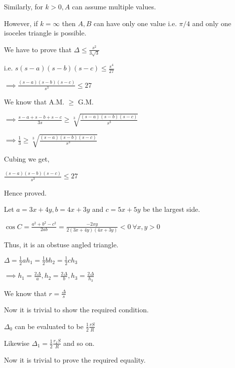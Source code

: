   Similarly, for $k > 0, A$ can assume multiple values.

  However, if $k = \infty$ then $A, B$ can have only one value i.e. $\pi/4$ and only one isoceles triangle is possible.

\item We have to prove that $\Delta \leq \frac{s^2}{3\sqrt{3}}$

  i.e. $s(s - a)(s - b)(s - c) \leq \frac{s^4}{27}$

  $\implies \frac{(s - a)(s - b)(s - c)}{s^3}\leq 27$

  We know that A.M. $\geq$ G.M.

  $\implies \frac{s - a + s - b + s - c}{3s}\geq \sqrt[3]{\frac{(s - a)(s - b)(s - c)}{s^3}}$

  $\implies \frac{1}{3}\geq \sqrt[3]{\frac{(s - a)(s - b)(s - c)}{s^3}}$

  Cubing we get,

  $\frac{(s - a)(s - b)(s - c)}{s^3}\leq 27$

  Hence proved.

\item Let $a=3x+4y,b=4x+3y$ and $c=5x+5y$ be the largest side.

  $\cos C = \frac{a^2 + b^2 - c^2}{2ab} = \frac{-2xy}{2(3x + 4y)(4x + 3y)} < 0~\forall x, y >0$

  Thus, it is an obstuse angled triangle.

\item $\Delta = \frac{1}{2}ah_1 = \frac{1}{2}bh_2 = \frac{1}{2}ch_3$

  $\implies h_1 = \frac{2\Delta}{a}, h_2 = \frac{2\Delta}{b}, h_3 = \frac{2\Delta}{h_3}$

  We know that $r = \frac{\Delta}{s}$

  Now it is trivial to show the required condition.

\item $\Delta_0$ can be evaluated to be $\frac{1}{2}\frac{rS}{R}$

  Likewise $\Delta_1 = \frac{1}{2}\frac{r_1S}{R}$ and so on.

  Now it is trivial to prove the required equality.
\stopitemize

